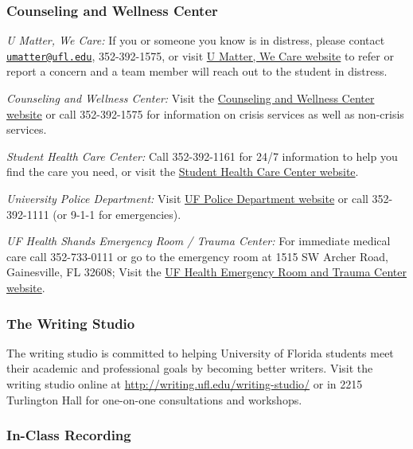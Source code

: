 \documentclass[
  12pt,
]{article}
\begin{document}
\hypertarget{counseling-and-wellness-center}{%
\subsubsection{\texorpdfstring{\textbf{Counseling and Wellness
Center}}{Counseling and Wellness Center}}\label{counseling-and-wellness-center}}

\emph{U Matter, We Care:} If you or someone you know is in distress,
please contact
\href{mailto:umatter@ufl.edu}{\nolinkurl{umatter@ufl.edu}},
352-392-1575, or visit \href{https://umatter.ufl.edu/}{U Matter, We Care
website} to refer or report a concern and a team member will reach out
to the student in distress.

\emph{Counseling and Wellness Center:} Visit the
\href{https://counseling.ufl.edu/}{Counseling and Wellness Center
website} or call 352-392-1575 for information on crisis services as well
as non-crisis services.

\emph{Student Health Care Center:} Call 352-392-1161 for 24/7
information to help you find the care you need, or visit the
\href{https://shcc.ufl.edu/}{Student Health Care Center website}.

\emph{University Police Department:} Visit
\href{https://police.ufl.edu/}{UF Police Department website} or call
352-392-1111 (or 9-1-1 for emergencies).

\emph{UF Health Shands Emergency Room / Trauma Center:} For immediate
medical care call 352-733-0111 or go to the emergency room at 1515 SW
Archer Road, Gainesville, FL 32608; Visit the
\href{https://ufhealth.org/emergency-room-trauma-center}{UF Health
Emergency Room and Trauma Center website}.

\hypertarget{the-writing-studio}{%
\subsubsection{\texorpdfstring{\textbf{The Writing
Studio}}{The Writing Studio}}\label{the-writing-studio}}

The writing studio is committed to helping University of Florida
students meet their academic and professional goals by becoming better
writers. Visit the writing studio online at
\url{http://writing.ufl.edu/writing-studio/} or in 2215 Turlington Hall
for one-on-one consultations and workshops.

\hypertarget{in-class-recording}{%
\subsubsection{\texorpdfstring{\textbf{In-Class
Recording}}{In-Class Recording}}\label{in-class-recording}}
\end{document}
